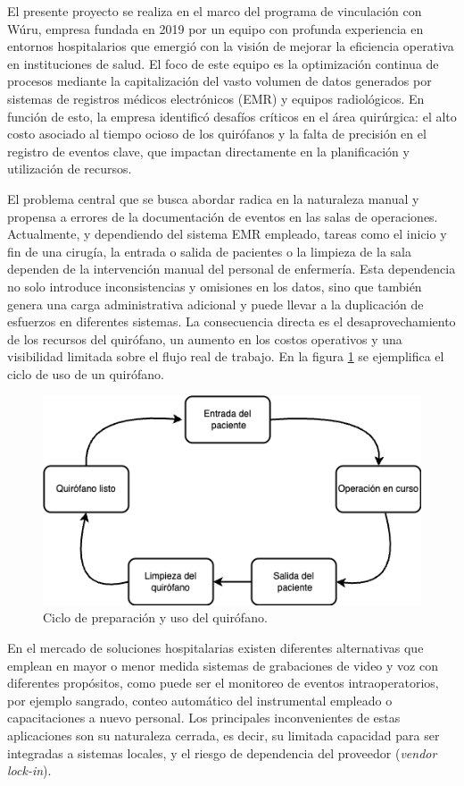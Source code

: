 \documentclass[
11pt, %
]{charter}
\begin{document}
El presente proyecto se realiza en el marco del programa de vinculación con Wúru, empresa fundada en 2019 por un equipo con profunda experiencia en entornos hospitalarios que emergió con la visión de mejorar la eficiencia operativa en instituciones de salud. El foco de este equipo es la optimización continua de procesos mediante la capitalización del vasto volumen de datos generados por sistemas de registros médicos electrónicos (EMR) y equipos radiológicos. En función de esto, la empresa identificó desafíos críticos en el área quirúrgica: el alto costo asociado al tiempo ocioso de los quirófanos y la falta de precisión en el registro de eventos clave,  que impactan directamente en la planificación y utilización de recursos.

El problema central que se busca abordar radica en la naturaleza manual y propensa a errores de la documentación de eventos en las salas de operaciones. Actualmente, y dependiendo del sistema EMR empleado, tareas como el inicio y fin de una cirugía, la entrada o salida de pacientes o la limpieza de la sala dependen de la intervención manual del personal de enfermería. Esta dependencia no solo introduce inconsistencias y omisiones en los datos, sino que también genera una carga administrativa adicional y puede llevar a la duplicación de esfuerzos en diferentes sistemas. La consecuencia directa es el desaprovechamiento de los recursos del quirófano, un aumento en los costos operativos y una visibilidad limitada sobre el flujo real de trabajo. En la figura \ref{fig:lifecycle} se ejemplifica el ciclo de uso de un quirófano.

\begin{figure}[htpb]
	\centering 
	\includegraphics[width=.6\textwidth]{./Figuras/lifecycle.png}
	\caption{Ciclo de preparación y uso del quirófano.}
	\label{fig:lifecycle}
\end{figure}

En el mercado de soluciones hospitalarias existen diferentes alternativas que emplean en mayor o menor medida sistemas de grabaciones de video y voz con diferentes propósitos, como puede ser el monitoreo de eventos intraoperatorios, por ejemplo sangrado, conteo automático del instrumental empleado o capacitaciones a nuevo personal. Los principales inconvenientes de estas aplicaciones son su naturaleza cerrada, es decir, su limitada capacidad para ser integradas a sistemas locales, y el riesgo de dependencia del proveedor (\textit{vendor lock-in}).
\end{document}
